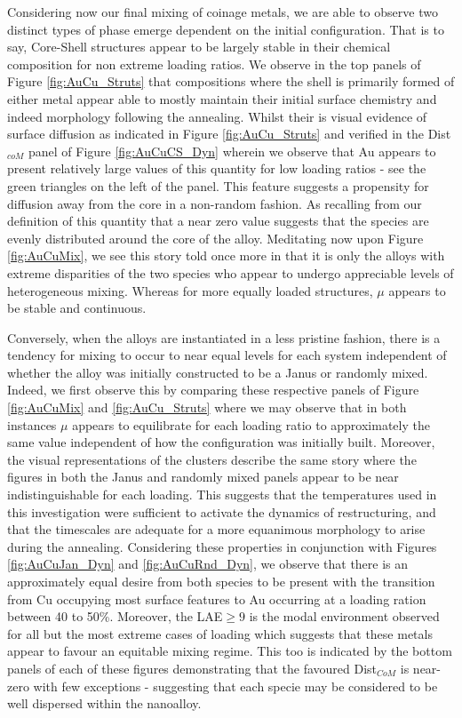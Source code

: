 Considering now our final mixing of coinage metals, we are able to observe two distinct types of phase emerge dependent on the initial configuration. That is to say, Core-Shell structures appear to be largely stable in their chemical composition for non extreme loading ratios. We observe in the top panels of Figure \ref{fig:AuCu_Struts} that compositions where the shell is primarily formed of either metal appear able to mostly maintain their initial surface chemistry and indeed morphology following the annealing. Whilst their is visual evidence of surface diffusion as indicated in Figure \ref{fig:AuCu_Struts} and verified in the Dist$_{coM}$ panel of Figure \ref{fig:AuCuCS_Dyn} wherein we observe that Au appears to present relatively large values of this quantity for low loading ratios - see the green triangles on the left of the panel. This feature suggests a propensity for diffusion away from the core in a non-random fashion. As recalling from our definition of this quantity that a near zero value suggests that the species are evenly distributed around the core of the alloy. Meditating now upon Figure \ref{fig:AuCuMix}, we see this story told once more in that it is only the alloys with extreme disparities of the two species who appear to undergo appreciable levels of heterogeneous mixing. Whereas for more equally loaded structures, $\mu$ appears to be stable and continuous.

Conversely, when the alloys are instantiated in a less pristine fashion, there is a tendency for mixing to occur to near equal levels for each system independent of whether the alloy was initially constructed to be a Janus or randomly mixed. Indeed, we first observe this by comparing these respective panels of Figure \ref{fig:AuCuMix} and \ref{fig:AuCu_Struts} where we may observe that in both instances $\mu$ appears to equilibrate for each loading ratio to approximately the same value independent of how the configuration was initially built. Moreover, the visual representations of the clusters describe the same story where the figures in both the Janus and randomly mixed panels appear to be near indistinguishable for each loading. This suggests that the temperatures used in this investigation were sufficient to activate the dynamics of restructuring, and that the timescales are adequate for a more equanimous morphology to arise during the annealing. Considering these properties in conjunction with Figures \ref{fig:AuCuJan_Dyn} and \ref{fig:AuCuRnd_Dyn}, we observe that there is an approximately equal desire from both species to be present with the transition from Cu occupying most surface features to Au occurring at a loading ration between 40 to 50\%. Moreover, the LAE$\geq9$ is the modal environment observed for all but the most extreme cases of loading which suggests that these metals appear to favour an equitable mixing regime. This too is indicated by the bottom panels of each of these figures demonstrating that the favoured Dist$_{CoM}$ is near-zero with few exceptions - suggesting that each specie may be considered to be well dispersed within the nanoalloy.

